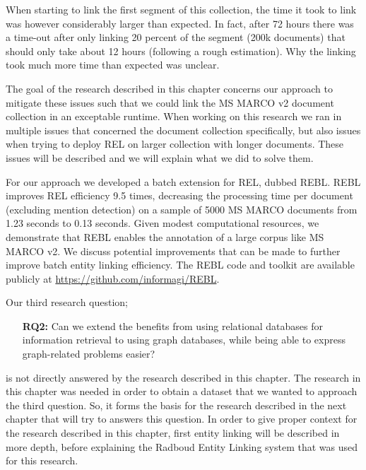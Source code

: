 When starting to link the first segment of this collection, the time it took to link was however considerably larger than expected. In fact, after 72 hours there was a time-out after only linking 20 percent of the segment (200k documents) that should only take about 12 hours (following a rough estimation). Why the linking took much more time than expected was unclear. 

The goal of the research described in this chapter concerns our approach to mitigate these issues such that we could link the MS MARCO v2 document collection in an exceptable runtime. When working on this research we ran in multiple issues that concerned the document collection specifically, but also issues when trying to deploy REL on larger collection with longer documents. These issues will be described and we will explain what we did to solve them. 

For our approach we developed a batch extension for REL, dubbed REBL. REBL improves REL efficiency 9.5 times, decreasing the processing time per document (excluding mention detection) on a sample of 5000 MS MARCO documents from 1.23 seconds to 0.13 seconds. Given modest computational resources, we demonstrate that REBL enables the annotation of a large corpus like MS MARCO v2. We discuss potential improvements that can be made to further improve batch entity linking efficiency. The REBL code and toolkit are available publicly at \url{https://github.com/informagi/REBL}.

Our third research question; 
\begin{itemize}
	\item[\textbf{RQ2:}] Can we extend the benefits from using relational databases for information retrieval to using graph databases, while being able to express graph-related problems easier?
\end{itemize} 
is not directly answered by the research described in this chapter. The research in this chapter was needed in order to obtain a dataset that we wanted to approach the third question. So, it forms the basis for the research described in the next chapter that will try to answers this question. In order to give proper context for the research described in this chapter, first entity linking will be described in more depth, before explaining the Radboud Entity Linking system that was used for this research. 


